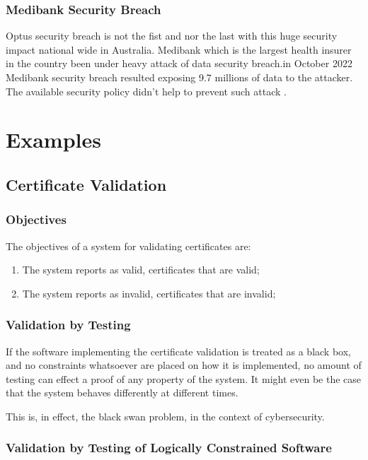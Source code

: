 \documentclass[journal]{IEEEtran}
\begin{document}
\subsubsection{Medibank Security Breach}
Optus security breach is not the fist and nor the last with this huge security impact national wide in Australia. 
Medibank which is the largest health insurer in the country been under heavy attack of data security breach.in October 
2022 Medibank security breach resulted exposing 9.7 millions of data to the attacker. The available security policy 
didn't help to prevent such attack \cite{biddle2022public}.


\section{Examples}

\subsection{Certificate Validation}

\subsubsection{Objectives}

The objectives of a system for validating certificates are:
\begin{enumerate}[CO-1]
  \item\label{validates1} The system reports as valid, certificates that are valid;
  \item\label{validates2} The system reports as invalid, certificates that are invalid;
\end{enumerate}

\subsubsection{Validation by Testing}

If the software implementing the certificate validation is treated
as a black box, and no constraints whatsoever are placed on how it is
implemented, no amount of testing can effect a proof of any
property of the system. It might even be the case that the system
behaves differently at different times.

This is, in effect, the black swan problem, in the context of cybersecurity.

\subsubsection{Validation by Testing of Logically Constrained Software}
\end{document}
